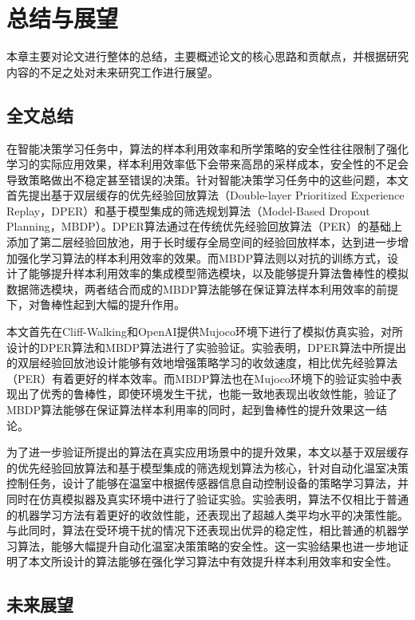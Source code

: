 
\chapter{总结与展望}\label{chap:summary}

本章主要对论文进行整体的总结，主要概述论文的核心思路和贡献点，并根据研究内容的不足之处对未来研究工作进行展望。

\section{全文总结}

在智能决策学习任务中，算法的样本利用效率和所学策略的安全性往往限制了强化学习的实际应用效果，样本利用效率低下会带来高昂的采样成本，安全性的不足会导致策略做出不稳定甚至错误的决策。针对智能决策学习任务中的这些问题，本文首先提出基于双层缓存的优先经验回放算法（Double-layer Prioritized Experience Replay，DPER）和基于模型集成的筛选规划算法（Model-Based Dropout Planning，MBDP）。DPER算法通过在传统优先经验回放算法（PER）的基础上添加了第二层经验回放池，用于长时缓存全局空间的经验回放样本，达到进一步增加强化学习算法的样本利用效率的效果。而MBDP算法则以对抗的训练方式，设计了能够提升样本利用效率的集成模型筛选模块，以及能够提升算法鲁棒性的模拟数据筛选模块，两者结合而成的MBDP算法能够在保证算法样本利用效率的前提下，对鲁棒性起到大幅的提升作用。

本文首先在Cliff-Walking和OpenAI提供Mujoco环境下进行了模拟仿真实验，对所设计的DPER算法和MBDP算法进行了实验验证。实验表明，DPER算法中所提出的双层经验回放池设计能够有效地增强策略学习的收敛速度，相比优先经验算法（PER）有着更好的样本效率。而MBDP算法也在Mujoco环境下的验证实验中表现出了优秀的鲁棒性，即使环境发生干扰，也能一致地表现出收敛性能，验证了MBDP算法能够在保证算法样本利用率的同时，起到鲁棒性的提升效果这一结论。

为了进一步验证所提出的算法在真实应用场景中的提升效果，本文以基于双层缓存的优先经验回放算法和基于模型集成的筛选规划算法为核心，针对自动化温室决策控制任务，设计了能够在温室中根据传感器信息自动控制设备的策略学习算法，并同时在仿真模拟器及真实环境中进行了验证实验。实验表明，算法不仅相比于普通的机器学习方法有着更好的收敛性能，还表现出了超越人类平均水平的决策性能。与此同时，算法在受环境干扰的情况下还表现出优异的稳定性，相比普通的机器学习算法，能够大幅提升自动化温室决策策略的安全性。这一实验结果也进一步地证明了本文所设计的算法能够在强化学习算法中有效提升样本利用效率和安全性。

\section{未来展望}

